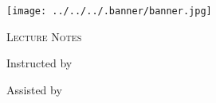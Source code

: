 \documentclass[a4paper,11pt,twoside]{report}
\begin{document}
{\centering
	\texttt{[image: ../../../.banner/banner.jpg]}\par\vspace{1cm}
	{\scshape\LARGE Lecture Notes \par}\vspace{1cm}{\huge\bfseries class<++>\par}
	\vspace{.5cm}{\large term<++> \par}\vspace{.5cm}{\Large\itshape Jasper Runco \par}
	\vfill Instructed by \par{\large \itshape <++> \par} Assisted by \par
{\large \itshape <++> \par}} \newpage \tableofcontents \pagestyle{plain}
	
\end{document}
